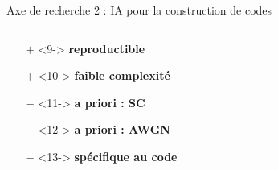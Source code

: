 \documentclass[t,compress,mathserif,12pt,xcolor=dvipsnames]{beamer}
\newcommand{\RED} [1]{\textcolor{Paired-5}{\textbf{#1}}}
\newcommand{\GREEN} [1]{\textcolor{Paired-3}{\textbf{#1}}}
\begin{document}
\begin{frame}[t]{Axe de recherche 2 : IA pour la construction de codes}
\begin{minipage}[t][5.0cm][t]{\textwidth}
\begin{columns}[T]
\begin{column}{0.45\textwidth}
        \vspace*{-1cm}
        \small{
        \begin{itemize}
          \setlength\itemsep{-0.5em}
          \item[\GREEN{$+$}]<9-> \GREEN{reproductible}
          \item[\GREEN{$+$}]<10-> \GREEN{faible complexité}
          \item[\RED{$-$}]  <11-> \RED  {a priori : SC}
          \item[\RED{$-$}]  <12-> \RED  {a priori : AWGN}
          \item[\RED{$-$}]  <13-> \RED  {spécifique au code}
        \end{itemize}
        }
      \end{column}
      \begin{column}{0.04\textwidth}
      \end{column}
      \begin{column}{0.45\textwidth}
        \vspace*{-1.1cm}
        \begin{center}

\end{center}
\end{column}
\end{columns}
\end{minipage}
\end{frame}
\end{document}
